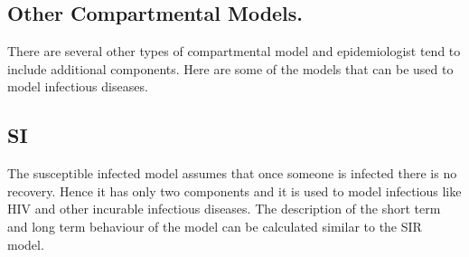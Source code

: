 \subsection{Other Compartmental Models.}

There are several other types of compartmental model and epidemiologist tend to include additional components. Here are some of the models that can be used to model infectious diseases.

\subsection{SI} The susceptible infected model assumes that once someone is infected there is no recovery. Hence it has only two components and it is used to model infectious like HIV and other incurable infectious diseases. The description of the short term and long term behaviour of the model can be calculated similar to the SIR model.
 

